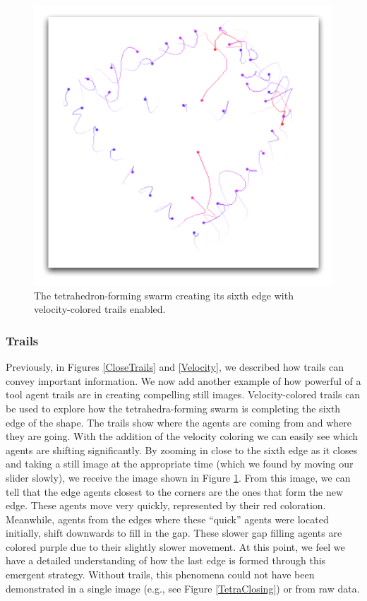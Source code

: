 \documentclass[conference]{IEEEtran}
\begin{document}
\begin{figure}
\centering
\includegraphics[scale=.5]{images/tetrastrategy.pdf}
\caption{
The tetrahedron-forming swarm creating its sixth edge with velocity-colored trails enabled.
}
\label{TetraStrategy}
\end{figure}

\subsubsection{Trails}

Previously, in Figures \ref{CloseTrails} and \ref{Velocity}, we described how trails can convey important information.
We now add another example of how powerful of a tool agent trails are in creating compelling still images.
Velocity-colored trails can be used to explore how the tetrahedra-forming swarm is completing the sixth edge of the shape.
The trails show where the agents are coming from and where they are going.
With the addition of the velocity coloring we can easily see which agents are shifting significantly.
By zooming in close to the sixth edge as it closes and taking a still image at the appropriate time (which we found
by moving our slider slowly), we receive the image shown in Figure \ref{TetraStrategy}.
From this image, we can tell that the edge agents closest to the corners are the ones that form the new edge.
These agents move very quickly, represented by their red coloration.
Meanwhile, agents from the edges where these ``quick'' agents were located initially, shift downwards to fill in the gap.
These slower gap filling agents are colored purple due to their slightly slower movement.
At this point, we feel we have a detailed understanding of how the last edge is formed through this emergent strategy.
Without trails, this phenomena could not have been demonstrated in a single image (e.g., see Figure \ref{TetraClosing})
or from raw data.
\end{document}
